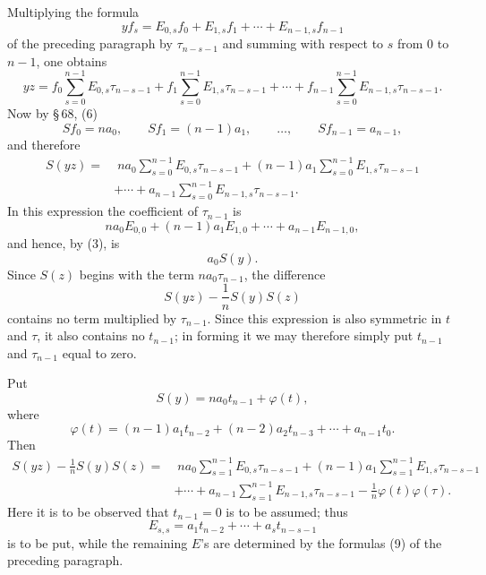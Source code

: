 \documentclass[11pt]{article}
\begin{document}
Multiplying the formula
\begin{equation}
 yf_s=E_{0,s}f_0+E_{1,s}f_1+\cdots+E_{n-1,s}f_{n-1}
\tag{3}
\end{equation}
of the preceding paragraph by $\tau_{n-s-1}$ and summing with respect to $s$ from $0$ to $n-1$, one obtains
\begin{equation}
 yz=f_0\sum_{s=0}^{n-1}E_{0,s}\tau_{n-s-1}
   +f_1\sum_{s=0}^{n-1}E_{1,s}\tau_{n-s-1}
   +\cdots+f_{n-1}\sum_{s=0}^{n-1}E_{n-1,s}\tau_{n-s-1}.
\tag{4}
\end{equation}
Now by \S\,68, (6)
\[
 Sf_0=na_0,\qquad Sf_1=(n-1)a_1,\qquad \ldots,\qquad Sf_{n-1}=a_{n-1},
\]
and therefore
\[
\begin{aligned}
S(yz)=&\;na_0\sum_{s=0}^{n-1}E_{0,s}\tau_{n-s-1}
+(n-1)a_1\sum_{s=0}^{n-1}E_{1,s}\tau_{n-s-1}\\
&+\cdots+a_{n-1}\sum_{s=0}^{n-1}E_{n-1,s}\tau_{n-s-1}.
\end{aligned}
\]
In this expression the coefficient of $\tau_{n-1}$ is
\[
 na_0E_{0,0}+(n-1)a_1E_{1,0}+\cdots+a_{n-1}E_{n-1,0},
\]
and hence, by (3), is
\[
 a_0S(y).
\]
Since $S(z)$ begins with the term $na_0\tau_{n-1}$, the difference
\begin{equation}
 S(yz)-\frac1nS(y)S(z)
\tag{5}
\end{equation}
contains no term multiplied by $\tau_{n-1}$. Since this expression is also symmetric in $t$ and $\tau$, it also contains no $t_{n-1}$; in forming it we may therefore simply put $t_{n-1}$ and $\tau_{n-1}$ equal to zero.

Put
\[
 S(y)=na_0t_{n-1}+\varphi(t),
\]
where
\begin{equation}
 \varphi(t)=(n-1)a_1t_{n-2}+(n-2)a_2t_{n-3}+\cdots+a_{n-1}t_0.
\tag{6}
\end{equation}
Then
\begin{equation}
\begin{aligned}
S(yz)-\frac1nS(y)S(z)=&\;na_0\sum_{s=1}^{n-1}E_{0,s}\tau_{n-s-1}
+(n-1)a_1\sum_{s=1}^{n-1}E_{1,s}\tau_{n-s-1}\\
&+\cdots+a_{n-1}\sum_{s=1}^{n-1}E_{n-1,s}\tau_{n-s-1}
-\frac1n\varphi(t)\varphi(\tau).
\end{aligned}
\tag{7}
\end{equation}
Here it is to be observed that $t_{n-1}=0$ is to be assumed; thus
\[
 E_{s,s}=a_1t_{n-2}+\cdots+a_st_{n-s-1}
\]
is to be put, while the remaining $E$'s are determined by the formulas (9) of the preceding paragraph.
\end{document}

